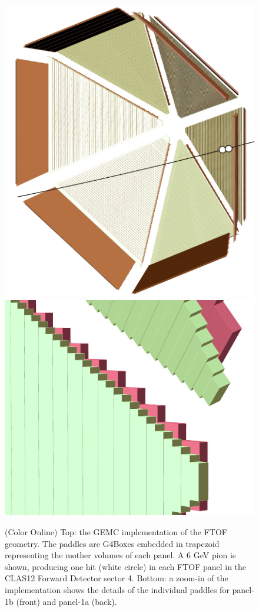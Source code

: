 \begin{figure}
	\centering
	\includegraphics[width=0.99\columnwidth,keepaspectratio]{img/ftofGeometry.png}
	\includegraphics[width=0.99\columnwidth,keepaspectratio]{img/ftofDetail.png}
	\caption{(Color Online) Top: the GEMC implementation of the FTOF geometry. The paddles are G4Boxes embedded in trapezoid
             representing the mother volumes of each panel. A 6 GeV pion is shown, producing one hit (white circle) in each FTOF panel
             in the CLAS12 Forward Detector sector 4.
             Bottom: a zoom-in of the implementation shows the details of the individual paddles for panel-1b (front)
             and panel-1a (back). }
	\label{fig:ftofGeometry}
\end{figure}

